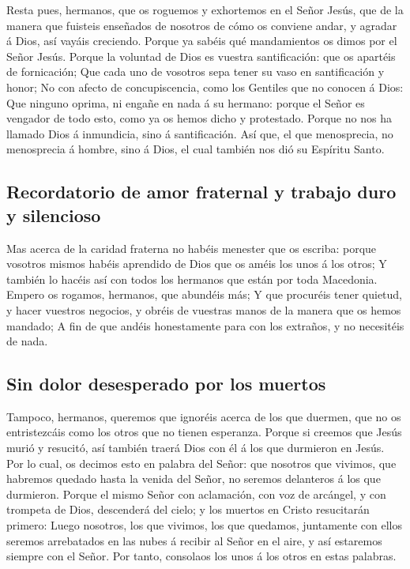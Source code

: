  Resta pues, hermanos, que os roguemos y exhortemos en el
Señor Jesús, que de la manera que fuisteis enseñados de nosotros de cómo
os conviene andar, y agradar á Dios, así vayáis creciendo.
 Porque ya sabéis qué mandamientos os dimos por el Señor
Jesús.  Porque la voluntad de Dios es vuestra
santificación: que os apartéis de fornicación;  Que cada
uno de vosotros sepa tener su vaso en santificación y honor;
 No con afecto de concupiscencia, como los Gentiles que no
conocen á Dios:  Que ninguno oprima, ni engañe en nada á
su hermano: porque el Señor es vengador de todo esto, como ya os hemos
dicho y protestado.  Porque no nos ha llamado Dios á
inmundicia, sino á santificación.  Así que, el que
menosprecia, no menosprecia á hombre, sino á Dios, el cual también nos
dió su Espíritu Santo.

\hypertarget{recordatorio-de-amor-fraternal-y-trabajo-duro-y-silencioso}{%
\subsection{Recordatorio de amor fraternal y trabajo duro y
silencioso}\label{recordatorio-de-amor-fraternal-y-trabajo-duro-y-silencioso}}

 Mas acerca de la caridad fraterna no habéis menester que
os escriba: porque vosotros mismos habéis aprendido de Dios que os améis
los unos á los otros;  Y también lo hacéis así con todos
los hermanos que están por toda Macedonia. Empero os rogamos, hermanos,
que abundéis más;  Y que procuréis tener quietud, y hacer
vuestros negocios, y obréis de vuestras manos de la manera que os hemos
mandado;  A fin de que andéis honestamente para con los
extraños, y no necesitéis de nada.

\hypertarget{sin-dolor-desesperado-por-los-muertos}{%
\subsection{Sin dolor desesperado por los
muertos}\label{sin-dolor-desesperado-por-los-muertos}}

 Tampoco, hermanos, queremos que ignoréis acerca de los
que duermen, que no os entristezcáis como los otros que no tienen
esperanza.  Porque si creemos que Jesús murió y resucitó,
así también traerá Dios con él á los que durmieron en Jesús.
 Por lo cual, os decimos esto en palabra del Señor: que
nosotros que vivimos, que habremos quedado hasta la venida del Señor, no
seremos delanteros á los que durmieron.  Porque el mismo
Señor con aclamación, con voz de arcángel, y con trompeta de Dios,
descenderá del cielo; y los muertos en Cristo resucitarán primero:
 Luego nosotros, los que vivimos, los que quedamos,
juntamente con ellos seremos arrebatados en las nubes á recibir al Señor
en el aire, y así estaremos siempre con el Señor.  Por
tanto, consolaos los unos á los otros en estas palabras.

